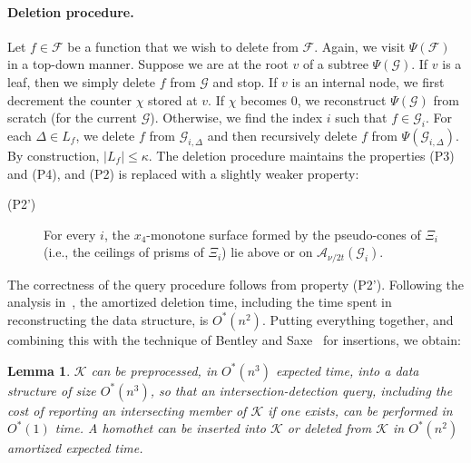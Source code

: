 \documentclass[11pt]{article}
\def\A{\mathcal{A}}
\def\F{\mathcal{F}}
\def\G{\mathcal{G}}
\def\K{\mathcal{K}}
\newtheorem{lemma}[theorem]{Lemma}
\theoremstyle{definition}
\begin{document}
\paragraph{Deletion procedure.}
\fi
Let $f\in\F$ be a function that we wish to delete from $\F$.
Again, we visit $\Psi(\F)$ in a top-down manner. Suppose we are at the root $v$ of a subtree $\Psi(\G)$. 
If $v$ is a leaf, then we simply delete $f$ from $\G$ and stop. If $v$ is an internal node, we first 
decrement the counter $\chi$ stored at $v$. If $\chi$ becomes $0$, we reconstruct $\Psi(\G)$ from
scratch (for the current $\G$). Otherwise, we find the index $i$ such that $f\in \G_i$. 
For each $\Delta\in L_f$,  we delete $f$ from $\G_{i,\Delta}$ and then recursively delete 
$f$ from $\Psi(\G_{i,\Delta})$. By construction, $|L_f|\le \kappa$. The deletion procedure 
maintains the properties (P3) and (P4), and (P2) is replaced with a slightly weaker property:
%
\smallskip
\begin{description}
	\item[(P2')] For every $i$, the $x_4$-monotone surface formed by the pseudo-cones of $\Xi_i$ 
        (i.e., the ceilings of prisms of $\Xi_i$) lie above or on $\A_{\nu/2t} (\G_i)$.
\end{description}
%
The correctness of the query procedure follows from property (P2'). Following the analysis 
in~\cite{AM95}, the amortized deletion time, including the time spent in reconstructing the data 
structure, is $O^*(n^2)$. 
Putting everything together, and combining this with the technique of Bentley and Saxe~\cite{BS80}
for insertions, we obtain:
%
\begin{lemma}
	\label{lem:log-qtime}
$\K$ can be preprocessed,
in $O^*(n^3)$ expected time, into a data structure of size $O^*(n^3)$, so that 
an intersection-detection query, including the cost of reporting an intersecting member of $\K$ 
if one exists, can be performed in $O^*(1)$ time. 
A homothet can be inserted into $\K$ or deleted from $\K$ in $O^*(n^2)$ amortized expected time.
\end{lemma}
%
\end{document}
